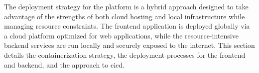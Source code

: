 The deployment strategy for the platform is a hybrid approach designed to take advantage of the strengths of both cloud hosting and local infrastructure while managing resource constraints. The frontend application is deployed globally via a cloud platform optimized for web applications, while the resource-intensive backend services are run locally and securely exposed to the internet. This section details the containerization strategy, the deployment processes for the frontend and backend, and the approach to \acl{cicd}.